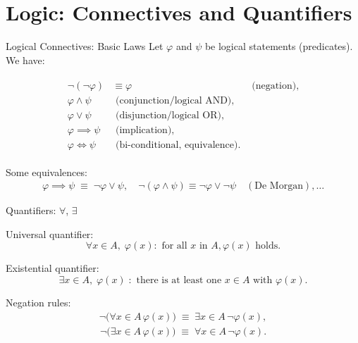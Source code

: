 \documentclass[11pt,aspectratio=43,ignorenonframetext,t]{beamer}
\begin{document}
\section{Logic: Connectives and Quantifiers}

\begin{frame}{Logical Connectives: Basic Laws}
Let \(\varphi\) and \(\psi\) be logical statements (predicates). We have:
\begin{block}{}
\hspace{-2cm}
\begin{align*}
\begin{aligned}
\neg (\neg \varphi) &\equiv \varphi &\text{ (negation)}, \\
\varphi \land \psi &\text{ (conjunction/logical AND)}, \\
\varphi \lor \psi &\text{ (disjunction/logical OR)}, \\
\varphi \implies \psi &\text{ (implication)}, \\
\varphi \iff \psi &\text{ (bi-conditional, equivalence)}.
\end{aligned}
\end{align*}    
\end{block}

Some equivalences:
\begin{align*}
\varphi \implies \psi \;\equiv\; \neg \varphi \lor \psi, \quad
\neg(\varphi \land \psi) \equiv \neg \varphi \lor \neg \psi \quad (\text{De Morgan}), \dots
\end{align*}
\end{frame}

\begin{frame}{Quantifiers: $\forall$, $\exists$}
  \begin{block}{Universal quantifier:}
  $$\forall x \in A,\; \varphi(x):\!\! \text{ for all } x \text{ in } A, \varphi(x)\text{ holds.}$$
  \end{block}
  \begin{block}{Existential quantifier:}
  $$\exists x \in A,\; \varphi(x) \;:\!\! \text{ there is at least one } x \in A \text{ with } \varphi(x).$$
\end{block}

Negation rules:
\begin{align*}
  \neg \bigl(\forall x \in A\, \varphi(x)\bigr) \;\equiv\; \exists x \in A\, \neg\varphi(x),
\end{align*}
\begin{align*}
  \neg \bigl(\exists x \in A\, \varphi(x)\bigr) \;\equiv\; \forall x \in A\, \neg\varphi(x).
\end{align*}
\end{frame}
\end{document}
